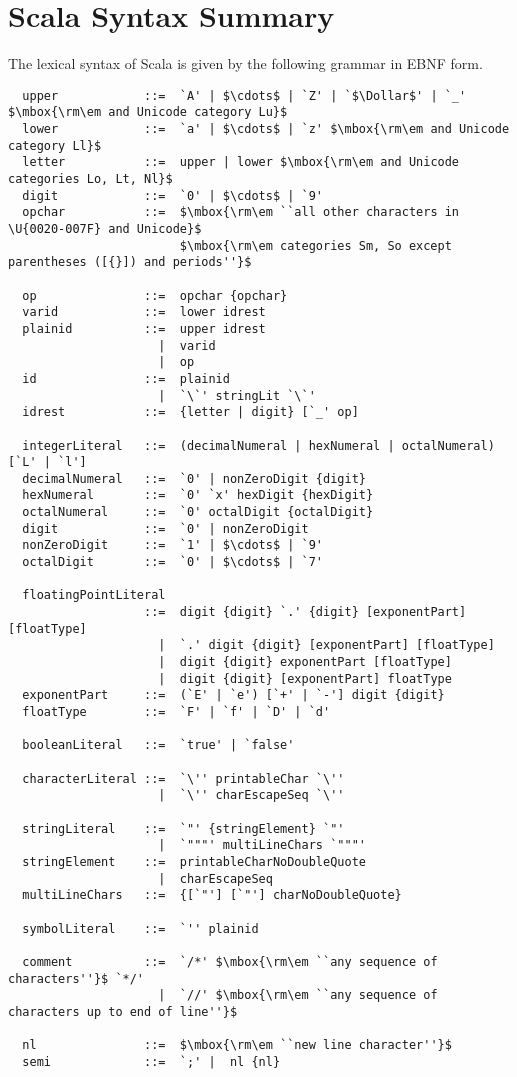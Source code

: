 
\chapter{Scala Syntax Summary}\label{sec:syntax}

The lexical syntax of Scala is given by the following grammar in EBNF
form.

{\small
\begin{lstlisting}
  upper            ::=  `A' | $\cdots$ | `Z' | `$\Dollar$' | `_' $\mbox{\rm\em and Unicode category Lu}$
  lower            ::=  `a' | $\cdots$ | `z' $\mbox{\rm\em and Unicode category Ll}$
  letter           ::=  upper | lower $\mbox{\rm\em and Unicode categories Lo, Lt, Nl}$
  digit            ::=  `0' | $\cdots$ | `9'
  opchar           ::=  $\mbox{\rm\em ``all other characters in \U{0020-007F} and Unicode}$
                        $\mbox{\rm\em categories Sm, So except parentheses ([{}]) and periods''}$

  op               ::=  opchar {opchar} 
  varid            ::=  lower idrest
  plainid          ::=  upper idrest
                     |  varid
                     |  op
  id               ::=  plainid
                     |  `\`' stringLit `\`'
  idrest           ::=  {letter | digit} [`_' op]

  integerLiteral   ::=  (decimalNumeral | hexNumeral | octalNumeral) [`L' | `l']
  decimalNumeral   ::=  `0' | nonZeroDigit {digit}
  hexNumeral       ::=  `0' `x' hexDigit {hexDigit}
  octalNumeral     ::=  `0' octalDigit {octalDigit}
  digit            ::=  `0' | nonZeroDigit
  nonZeroDigit     ::=  `1' | $\cdots$ | `9'
  octalDigit       ::=  `0' | $\cdots$ | `7'

  floatingPointLiteral 
                   ::=  digit {digit} `.' {digit} [exponentPart] [floatType]
                     |  `.' digit {digit} [exponentPart] [floatType]
                     |  digit {digit} exponentPart [floatType]
                     |  digit {digit} [exponentPart] floatType
  exponentPart     ::=  (`E' | `e') [`+' | `-'] digit {digit}
  floatType        ::=  `F' | `f' | `D' | `d'

  booleanLiteral   ::=  `true' | `false'

  characterLiteral ::=  `\'' printableChar `\''
                     |  `\'' charEscapeSeq `\''

  stringLiteral    ::=  `"' {stringElement} `"'
                     |  `"""' multiLineChars `"""'
  stringElement    ::=  printableCharNoDoubleQuote 
                     |  charEscapeSeq
  multiLineChars   ::=  {[`"'] [`"'] charNoDoubleQuote}

  symbolLiteral    ::=  `'' plainid

  comment          ::=  `/*' $\mbox{\rm\em ``any sequence of characters''}$ `*/'
                     |  `//' $\mbox{\rm\em ``any sequence of characters up to end of line''}$

  nl               ::=  $\mbox{\rm\em ``new line character''}$
  semi             ::=  `;' |  nl {nl}       
\end{lstlisting}}

